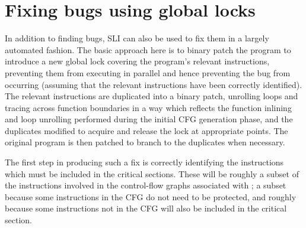 
  
\section{Fixing bugs using global locks}
\label{sect:fix_global_lock}

In addition to finding bugs, SLI can also be used to fix them in a
largely automated fashion.  The basic approach here is to binary patch
the program to introduce a new global lock covering the program's
relevant instructions, preventing them from executing in parallel and
hence preventing the bug from occurring (assuming that the relevant
instructions have been correctly identified).  The relevant
instructions are duplicated into a binary patch, unrolling loops and
tracing across function boundaries in a way which reflects the
function inlining and loop unrolling performed during the initial CFG
generation phase, and the duplicates modified to acquire and release
the lock at appropriate points.  The original program is then patched
to branch to the duplicates when necessary.

The first step in producing such a fix is correctly identifying the
instructions which must be included in the critical sections.  These
will be roughly a subset of the instructions involved in the
control-flow graphs associated with \StateMachines; a subset because
some instructions in the CFG do not need to be protected, and roughly
because some instructions not in the CFG will also be included in the
critical section.

